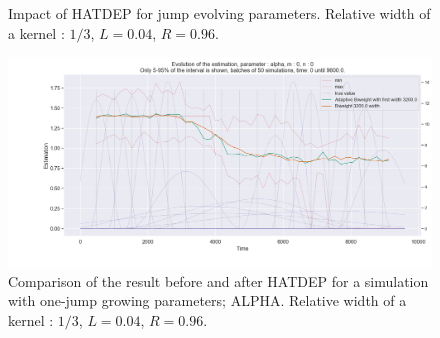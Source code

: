 \begin{figure}
\centering
{} 
\caption{Impact of HATDEP for jump evolving parameters. Relative width of a kernel : $1/3$, $L = 0.04$, $R = 0.96$.}
\label{fig:compar_kernels_2}
\end{figure}

\begin{figure}
\centering
\includegraphics[width = 0.90 \textwidth]{../imag/chap3/2/1.png}
\caption{Comparison of the result before and after HATDEP for a simulation with one-jump growing parameters; ALPHA. Relative width of a kernel : $1/3$, $L = 0.04$, $R = 0.96$.}
\label{fig:first_estimate_2_alpha}
\end{figure}

